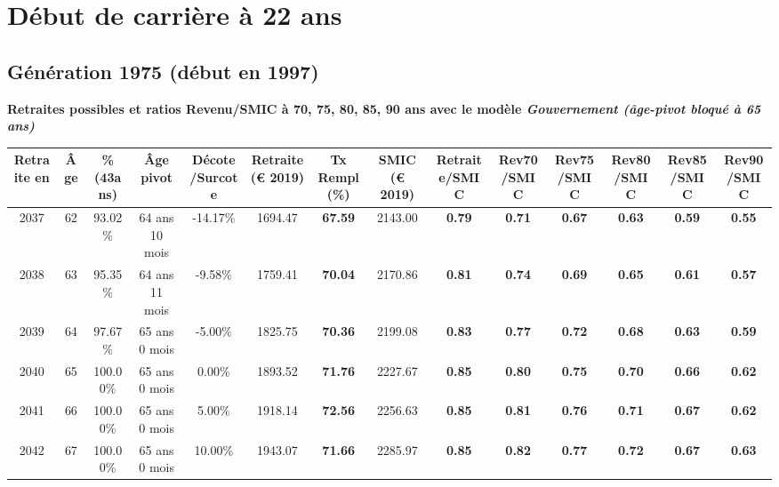  \addto{\captionsenglish}{ \renewcommand{\mtctitle}{}} \setcounter{minitocdepth}{2} 
 \minitoc \newpage 

\section{Début de carrière à 22 ans} 

\subsection{Génération 1975 (début en 1997)} 

{\bf \noindent Retraites possibles et ratios Revenu/SMIC à 70, 75, 80, 85, 90 ans avec le modèle \emph{Gouvernement (âge-pivot bloqué à 65 ans)}}  
 
\begin{adjustbox}{max width=\textwidth} 
\begin{tabular}[htb]{|c|c||c|c|c||c|c||c||c|c|c|c|c|c|} 
\hline 
 Retraite en &  Âge &  \%(43ans) &  Âge pivot &  Décote/Surcote &  Retraite (\euro{} 2019) &  Tx Rempl(\%) &  SMIC (\euro{} 2019) &  Retraite/SMIC &  Rev70/SMIC &  Rev75/SMIC &  Rev80/SMIC &  Rev85/SMIC &  Rev90/SMIC \\ 
\hline \hline 
 2037 &  62 &  93.02\% &  64 ans 10 mois &  -14.17\% &  1694.47 &  {\bf 67.59} &  2143.00 &  {\bf {\color{red} 0.79}} &  {\bf {\color{red} 0.71}} &  {\bf {\color{red} 0.67}} &  {\bf {\color{red} 0.63}} &  {\bf {\color{red} 0.59}} &  {\bf {\color{red} 0.55}} \\ 
\hline 
 2038 &  63 &  95.35\% &  64 ans 11 mois &  -9.58\% &  1759.41 &  {\bf 70.04} &  2170.86 &  {\bf {\color{red} 0.81}} &  {\bf {\color{red} 0.74}} &  {\bf {\color{red} 0.69}} &  {\bf {\color{red} 0.65}} &  {\bf {\color{red} 0.61}} &  {\bf {\color{red} 0.57}} \\ 
\hline 
 2039 &  64 &  97.67\% &  65 ans 0 mois &  -5.00\% &  1825.75 &  {\bf 70.36} &  2199.08 &  {\bf {\color{red} 0.83}} &  {\bf {\color{red} 0.77}} &  {\bf {\color{red} 0.72}} &  {\bf {\color{red} 0.68}} &  {\bf {\color{red} 0.63}} &  {\bf {\color{red} 0.59}} \\ 
\hline 
 2040 &  65 &  100.00\% &  65 ans 0 mois &  0.00\% &  1893.52 &  {\bf 71.76} &  2227.67 &  {\bf {\color{red} 0.85}} &  {\bf {\color{red} 0.80}} &  {\bf {\color{red} 0.75}} &  {\bf {\color{red} 0.70}} &  {\bf {\color{red} 0.66}} &  {\bf {\color{red} 0.62}} \\ 
\hline 
 2041 &  66 &  100.00\% &  65 ans 0 mois &  5.00\% &  1918.14 &  {\bf 72.56} &  2256.63 &  {\bf {\color{red} 0.85}} &  {\bf {\color{red} 0.81}} &  {\bf {\color{red} 0.76}} &  {\bf {\color{red} 0.71}} &  {\bf {\color{red} 0.67}} &  {\bf {\color{red} 0.62}} \\ 
\hline 
 2042 &  67 &  100.00\% &  65 ans 0 mois &  10.00\% &  1943.07 &  {\bf 71.66} &  2285.97 &  {\bf {\color{red} 0.85}} &  {\bf {\color{red} 0.82}} &  {\bf {\color{red} 0.77}} &  {\bf {\color{red} 0.72}} &  {\bf {\color{red} 0.67}} &  {\bf {\color{red} 0.63}} \\ 
\hline 
\hline 
\end{tabular} 
\end{adjustbox} 
 
